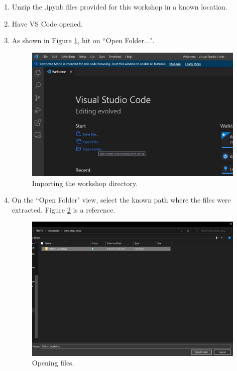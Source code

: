 \documentclass{assignment}
\begin{document}
\begin{enumerate}
    \item Unzip the .ipynb files provided for this workshop in a known location.
    \item Have VS Code opened.
    \item {
        As shown in Figure \ref{fig:vsc_import_0}, hit on ``Open Folder...".
        \begin{figure}[h]
         \centering 
            \includegraphics[width=12cm]{assets/vs_code_open_folder.JPG}
            \caption{Importing the workshop directory.}
            \label{fig:vsc_import_0}
        \end{figure}
    }
    \newpage
    \item {
        On the ``Open Folder" view, select the known path where the files were extracted. Figure \ref{fig:vsc_import_1} is a reference.
        \begin{figure}[h]
         \centering 
            \includegraphics[width=11cm]{assets/vs_code_select_folder.JPG}
            \caption{Opening files.}
            \label{fig:vsc_import_1}
        \end{figure}        
}
\end{enumerate}
\end{document}
